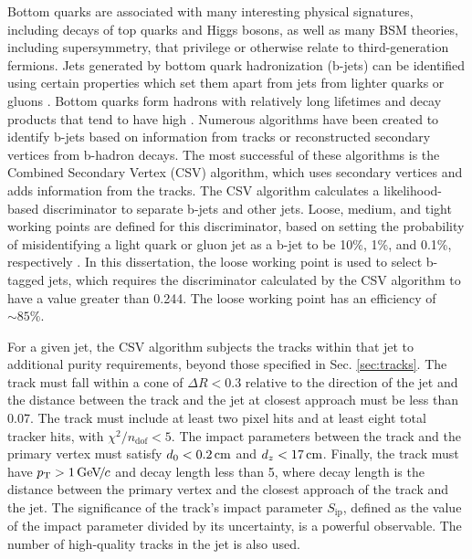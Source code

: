 Bottom quarks are associated with many interesting physical signatures, including decays of top quarks and Higgs bosons, as well as many BSM theories, including supersymmetry, that privilege or otherwise relate to third-generation fermions. Jets generated by bottom quark hadronization (b-jets) can be identified using certain properties which set them apart from jets from lighter quarks or gluons \cite{BTV-12-001}. Bottom quarks form hadrons with relatively long lifetimes and decay products that tend to have high \pt. Numerous algorithms have been created to identify b-jets based on information from tracks or reconstructed secondary vertices from b-hadron decays. The most successful of these algorithms is the Combined Secondary Vertex (CSV) algorithm, which uses secondary vertices and adds information from the tracks. The CSV algorithm calculates a likelihood-based discriminator to separate b-jets and other jets. Loose, medium, and tight working points are defined for this discriminator, based on setting the probability of misidentifying a light quark or gluon jet as a b-jet to be 10\%, 1\%, and 0.1\%, respectively \cite{CMS-PAS-BTV-13-001}. In this dissertation, the loose working point is used to select b-tagged jets, which requires the discriminator calculated by the CSV algorithm to have a value greater than 0.244. The loose working point has an efficiency of ${\sim}85\%$.

For a given jet, the CSV algorithm subjects the tracks within that jet to additional purity requirements, beyond those specified in Sec. \ref{sec:tracks}. The track must fall within a cone of $\Delta R < 0.3$ relative to the direction of the jet and the distance between the track and the jet at closest approach must be less than 0.07\cm. The track must include at least two pixel hits and at least eight total tracker hits, with $\chi^2/n_{\text{dof}} < 5$. The impact parameters between the track and the primary vertex must satisfy $d_0 < 0.2\,\text{cm}$ and $d_z < 17\,\text{cm}$. Finally, the track must have $p_{\mathrm{T}}>1{\,\text{Ge\hspace{-.08em}V\hspace{-0.16em}/\hspace{-0.08em}}c}$ and decay length less than 5\cm, where decay length is the distance between the primary vertex and the closest approach of the track and the jet. The significance of the track's impact parameter $S_{\text{ip}}$, defined as the value of the impact parameter divided by its uncertainty, is a powerful observable. The number of high-quality tracks in the jet is also used.


